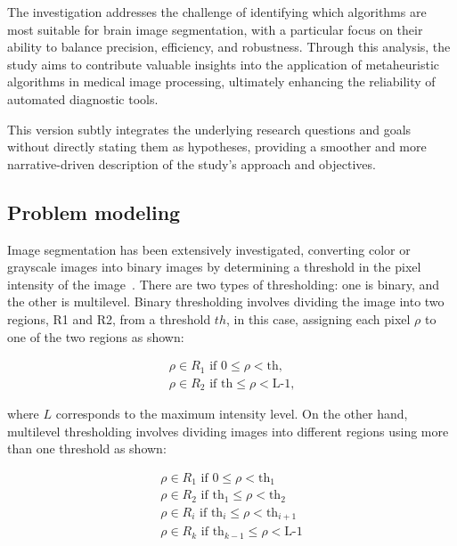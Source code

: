 \documentclass{elsarticle}
\begin{document}
The investigation addresses the challenge of identifying which algorithms are most suitable for brain image segmentation, with a particular focus on their ability to balance precision, efficiency, and robustness. Through this analysis, the study aims to contribute valuable insights into the application of metaheuristic algorithms in medical image processing, ultimately enhancing the reliability of automated diagnostic tools.

This version subtly integrates the underlying research questions and goals without directly stating them as hypotheses, providing a smoother and more narrative-driven description of the study’s approach and objectives.

\subsection{Problem modeling}

Image segmentation has been extensively investigated, converting color or grayscale images into binary images by determining a threshold in the pixel intensity of the image~\cite{Sankur2004}. There are two types of thresholding: one is binary, and the other is multilevel. Binary thresholding involves dividing the image into two regions, R1 and R2, from a threshold $th$, in this case, assigning each pixel $\rho$ to one of the two regions as shown:

\begin{equation}
\begin{gathered}
\rho \in R_1 \text{ if } 0 \leq \rho < \text{th,} \\
\rho \in R_2 \text{ if } \text{th} \leq \rho < \text{L-1,}
\end{gathered}
\label{eq1}
\end{equation}

\noindent
where $L$ corresponds to the maximum intensity level. On the other hand, multilevel thresholding involves dividing images into different regions using more than one threshold as shown:

\begin{equation}
\begin{gathered}
\rho \in R_1 \text{ if } 0 \leq \rho < \text{th}_1 \\
\rho \in R_2 \text{ if } \text{th}_1 \leq \rho < \text{th}_2 \\
\rho \in R_i \text{ if } \text{th}_i \leq \rho < \text{th}_{i+1} \\
\rho \in R_k \text{ if } \text{th}_{k-1} \leq \rho < \text{L-1}
\end{gathered}
\label{eq2}
\end{equation}
\end{document}
